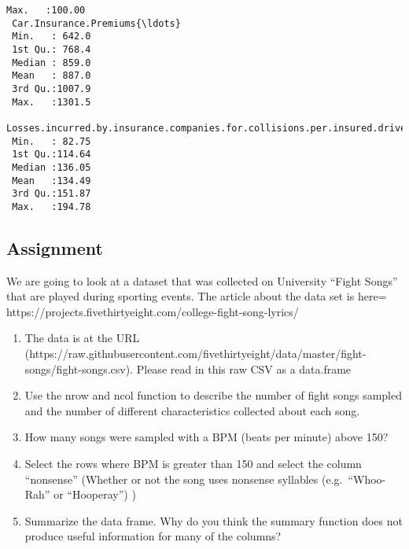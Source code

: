 \begin{Verbatim}[commandchars=\\\{\}]
 Max.   :100.00                                                                                        
 Car.Insurance.Premiums{\ldots}
 Min.   : 642.0            
 1st Qu.: 768.4            
 Median : 859.0            
 Mean   : 887.0            
 3rd Qu.:1007.9            
 Max.   :1301.5            
 Losses.incurred.by.insurance.companies.for.collisions.per.insured.driver{\ldots}
 Min.   : 82.75                                                              
 1st Qu.:114.64                                                              
 Median :136.05                                                              
 Mean   :134.49                                                              
 3rd Qu.:151.87                                                              
 Max.   :194.78                                                              
    \end{Verbatim}

    
    \hypertarget{assignment}{%
\subsection{Assignment}\label{assignment}}

We are going to look at a dataset that was collected on University
``Fight Songs'' that are played during sporting events. The article
about the data set is here=
https://projects.fivethirtyeight.com/college-fight-song-lyrics/

\begin{enumerate}
\def\labelenumi{\arabic{enumi}.}
\tightlist
\item
  The data is at the URL
  (https://raw.githubusercontent.com/fivethirtyeight/data/master/fight-songs/fight-songs.csv).
  Please read in this raw CSV as a data.frame
\item
  Use the nrow and ncol function to describe the number of fight songs
  sampled and the number of different characteristics collected about
  each song.
\item
  How many songs were sampled with a BPM (beats per minute) above 150?
\item
  Select the rows where BPM is greater than 150 and select the column
  ``nonsense'' (Whether or not the song uses nonsense syllables
  (e.g.~``Whoo-Rah'' or ``Hooperay'') )
\item
  Summarize the data frame. Why do you think the summary function does
  not produce useful information for many of the columns?
\end{enumerate}
